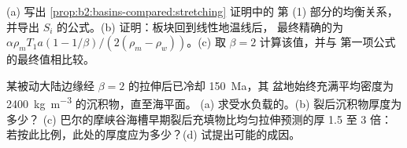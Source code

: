 \begin{exercise}[$\star\star\star$]\label{exo:b2:basins-compared:11}
(a) 写出 \cref{prop:b2:basins-compared:stretching} 证明中的
第 (1) 部分的均衡关系，并导出 $S_i$ 的公式。(b) 证明：板块回到线性地温线后，
最终精确的为 $\alpha\rho_m T_1 a(1 - 1/\beta)/(2(\rho_m -
\rho_w))$。(c) 取 $\beta = 2$ 计算该值，并与
第一项公式的最终值相比较。
\end{exercise}

\begin{exercise}[$\star\star\star$]\label{exo:b2:basins-compared:12}
某被动大陆边缘经 $\beta = 2$ 的拉伸后已冷却 \qty{150}{Ma}，其
盆地始终充满平均密度为 \qty{2400}{kg.m^{-3}} 的沉积物，直至海平面。
(a) 求受水负载的。(b) 裂后沉积物厚度为多少？
(c) 巴尔的摩峡谷海槽早期裂后充填物比均匀拉伸预测的厚 1.5 至 3 倍：
若按此比例，此处的厚度应为多少？(d) 试提出可能的成因。
\end{exercise}

